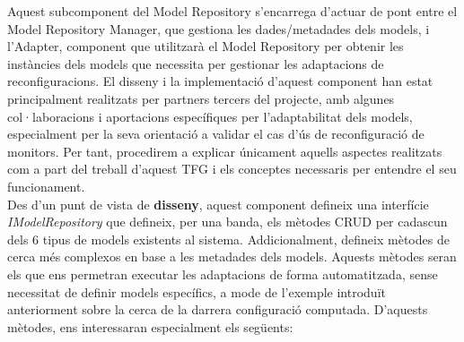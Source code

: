 Aquest subcomponent del Model Repository s'encarrega d'actuar de pont entre el Model Repository Manager, que gestiona les dades/metadades dels models, i l'Adapter, component que utilitzarà el Model Repository per obtenir les instàncies dels models que necessita per gestionar les adaptacions de reconfiguracions. El disseny i la implementació d'aquest component han estat principalment realitzats per partners tercers del projecte, amb algunes col·laboracions i aportacions específiques per l'adaptabilitat dels models, especialment per la seva orientació a validar el cas d'ús de reconfiguració de monitors. Per tant, procedirem a explicar únicament aquells aspectes realitzats com a part del treball d'aquest TFG i els conceptes necessaris per entendre el seu funcionament.\\

Des d'un punt de vista de \textbf{disseny}, aquest component defineix una interfície \textit{IModelRepository} que defineix, per una banda, els mètodes CRUD per cadascun dels 6 tipus de models existents al sistema. Addicionalment, defineix mètodes de cerca més complexos en base a les metadades dels models. Aquests mètodes seran els que ens permetran executar les adaptacions de forma automatitzada, sense necessitat de definir models específics, a mode de l'exemple introduït anteriorment sobre la cerca de la darrera configuració computada. D'aquests mètodes, ens interessaran especialment els següents:

